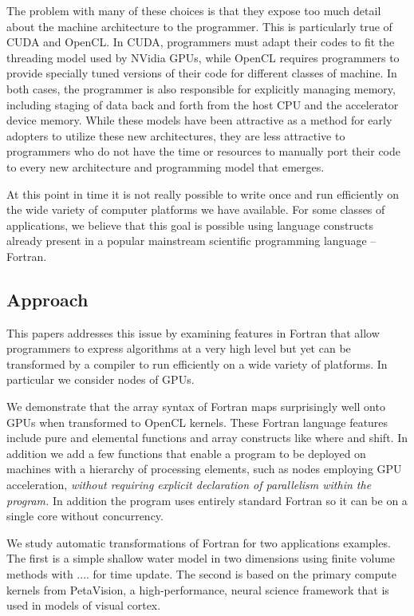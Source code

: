 \documentclass[10pt, conference, compsocconf]{IEEEtran}
\begin{document}
The problem with many of these choices is that they expose too much detail
about the machine architecture to the programmer.  
This is particularly true of CUDA and OpenCL.  In CUDA, programmers must
adapt their codes to fit the threading model used by NVidia GPUs, while
OpenCL requires programmers to provide specially tuned versions of
their code for different classes of machine.  In both cases, the programmer
is also responsible for explicitly managing memory, including staging of
data back and forth from the host CPU and the accelerator device memory.
While these models have been attractive as a method for early adopters
to utilize these new architectures, they are less attractive to programmers
who do not have the time or resources to manually port their code to every
new architecture and programming model that emerges.

At this point in time it is not really possible to write once and
run efficiently on the wide variety of computer platforms we have
available.  For some classes of applications, we believe that this goal
is possible using language constructs already present in a popular
mainstream scientific programming language -- Fortran.

\subsection{Approach}

This papers addresses this issue by examining features in Fortran that
allow programmers to express algorithms at a very high level but yet
can be transformed by a compiler to run efficiently on a wide variety
of platforms.  In particular we consider nodes of GPUs.

We demonstrate that the array syntax of Fortran maps surprisingly well
onto GPUs when transformed to OpenCL kernels.  These Fortran language
features include pure and elemental functions and array constructs
like where and shift.  In addition we add a few functions that enable
a program to be deployed on machines with a hierarchy of processing
elements, such as nodes employing GPU acceleration, \emph{without
  requiring explicit declaration of parallelism within the program.}
In addition the program uses entirely standard Fortran so it can be on
a single core without concurrency.

We study automatic transformations of Fortran for two applications examples.
The first is a simple shallow water model in two dimensions using
finite volume methods with .... for time update.  The second is based
on the primary compute kernels from PetaVision, a high-performance, 
neural science framework that is used in models of visual cortex.
\end{document}
